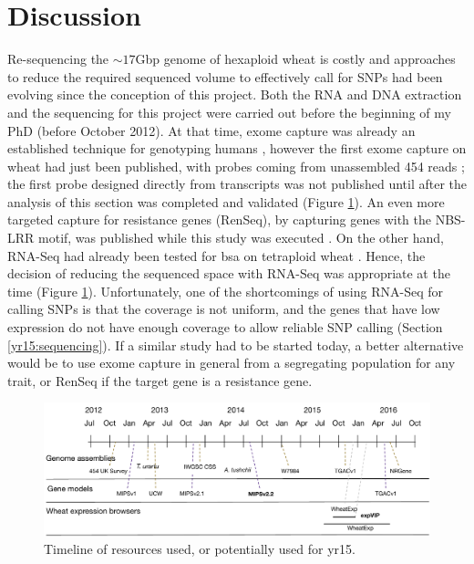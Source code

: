 \section{Discussion} 


Re-sequencing the $\sim17$Gbp genome of hexaploid wheat is costly and approaches to reduce the required sequenced volume to effectively call for SNPs had been evolving since the conception of this project. 
Both the RNA and DNA extraction and the sequencing for this project were carried out before the beginning of my PhD (before October 2012). 
At that time, exome capture was already an established technique for genotyping humans \citep{Ng2009}, however the first exome capture on wheat had just been published, with probes coming from unassembled 454 reads \citep{Winfield2012}; the first probe designed directly from transcripts \citep{Henry2014} was not published until after the analysis of this section was completed and validated (Figure \ref{fig:yr15:timeline}).
An even more targeted capture for resistance genes (RenSeq), by capturing genes with the NBS-LRR motif, was published while this study was executed \citep{Jupe2013}.
On the other hand, RNA-Seq had already been tested for \acrlong{bsa} on tetraploid wheat \citep{Trick2012}.  
Hence, the decision of reducing the sequenced space with RNA-Seq was appropriate at the time (Figure \ref{fig:yr15:timeline}). 
Unfortunately, one of the shortcomings of using RNA-Seq for calling SNPs is that the coverage is not uniform, and the genes that have low expression do not have enough coverage to allow reliable SNP calling (Section  \ref{yr15:sequencing}).
If a similar study had to be started today, a better alternative would be to use exome capture in general from a segregating population for any trait, or RenSeq if the target gene is a resistance gene. 

\begin{figure}
\includegraphics[width=1\textwidth]{expVIP/Figures/Timeline.pdf}
\caption{Timeline of resources used, or potentially used for \gls{yr15}.}
\label{fig:yr15:timeline}
\end{figure}

